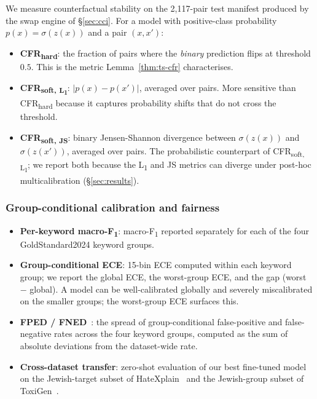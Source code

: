 We measure counterfactual stability on the 2{,}117-pair test manifest produced by the swap engine of \S\ref{sec:cci}. For a model with positive-class probability $p(x) = \sigma(z(x))$ and a pair $(x, x')$:
\begin{itemize}[leftmargin=*,itemsep=1pt]
    \item \textbf{CFR\textsubscript{hard}}: the fraction of pairs where the \emph{binary} prediction flips at threshold $0.5$. This is the metric Lemma~\ref{thm:ts-cfr} characterises.
    \item \textbf{CFR\textsubscript{soft, L\textsubscript{1}}}: $|p(x) - p(x')|$, averaged over pairs. More sensitive than CFR\textsubscript{hard} because it captures probability shifts that do not cross the threshold.
    \item \textbf{CFR\textsubscript{soft, JS}}: binary Jensen-Shannon divergence between $\sigma(z(x))$ and $\sigma(z(x'))$, averaged over pairs. The probabilistic counterpart of CFR\textsubscript{soft, L\textsubscript{1}}; we report both because the L\textsubscript{1} and JS metrics can diverge under post-hoc multicalibration (\S\ref{sec:results}).
\end{itemize}

\subsubsection{Group-conditional calibration and fairness}

\begin{itemize}[leftmargin=*,itemsep=1pt]
    \item \textbf{Per-keyword macro-F\textsubscript{1}}: macro-F\textsubscript{1} reported separately for each of the four GoldStandard2024 keyword groups.
    \item \textbf{Group-conditional ECE}: 15-bin ECE computed within each keyword group; we report the global ECE, the worst-group ECE, and the gap (worst $-$ global). A model can be well-calibrated globally and severely miscalibrated on the smaller groups; the worst-group ECE surfaces this.
    \item \textbf{FPED / FNED}~\citep{dixon2018measuring}: the spread of group-conditional false-positive and false-negative rates across the four keyword groups, computed as the sum of absolute deviations from the dataset-wide rate.
    \item \textbf{Cross-dataset transfer}: zero-shot evaluation of our best fine-tuned model on the Jewish-target subset of HateXplain~\citep{mathew2021hatexplain} and the Jewish-group subset of ToxiGen~\citep{hartvigsen2022toxigen}.
\end{itemize}

